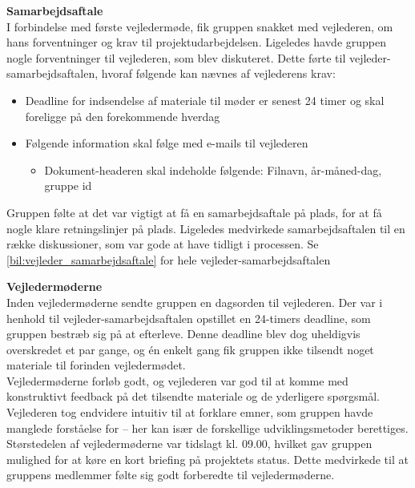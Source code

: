 







\textbf{Samarbejdsaftale}\\ %
I forbindelse med første vejledermøde, fik gruppen snakket med vejlederen, om hans forventninger og krav til projektudarbejdelsen. Ligeledes havde gruppen nogle forventninger til vejlederen, som blev diskuteret. Dette førte til vejleder-samarbejdsaftalen, hvoraf følgende kan nævnes af vejlederens krav:
\begin{itemize}
    \item Deadline for indsendelse af materiale til møder er senest 24 timer og skal foreligge på den forekommende hverdag
    \item Følgende information skal følge med e-mails til vejlederen
    \begin{itemize}
        \item Dokument-headeren skal indeholde følgende: Filnavn, år-måned-dag, gruppe id
    \end{itemize}
\end{itemize}
Gruppen følte at det var vigtigt at få en samarbejdsaftale på plads, for at få nogle klare retningslinjer på plads. Ligeledes medvirkede samarbejdsaftalen til en række diskussioner, som var gode at have tidligt i processen. Se \ref{bil:vejleder_samarbejdsaftale} for hele vejleder-samarbejdsaftalen

\textbf{Vejledermøderne}\\ %
Inden vejledermøderne sendte gruppen en dagsorden til vejlederen. Der var i henhold til vejleder-samarbejdsaftalen opstillet en 24-timers deadline, som gruppen bestræb sig på at efterleve. Denne deadline blev dog uheldigvis overskredet et par gange, og én enkelt gang fik gruppen ikke tilsendt noget materiale til forinden vejledermødet. \\

Vejledermøderne forløb godt, og vejlederen var god til at komme med konstruktivt feedback på det tilsendte materiale og de yderligere spørgsmål. Vejlederen tog endvidere intuitiv til at forklare emner, som gruppen havde manglede forståelse for – her kan især de forskellige udviklingsmetoder berettiges. \\

Størstedelen af vejledermøderne var tidslagt kl. 09.00, hvilket gav gruppen mulighed for at køre en kort briefing på projektets status. Dette medvirkede til at gruppens medlemmer følte sig godt forberedte til vejledermøderne.
